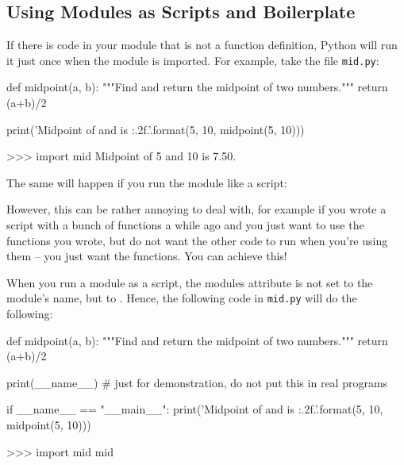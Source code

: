 \documentclass[11pt]{cselabheader}
\begin{document}
{\subsection{Using Modules as Scripts and Boilerplate}

If there is code in your module that is not a function definition, Python will
run it just once when the module is imported. For example, take the file
\texttt{mid.py}:

\begin{python3code}
def midpoint(a, b):
    """Find and return the midpoint of two numbers."""
    return (a+b)/2

print('Midpoint of {} and {} is {:.2f}.'.format(5, 10, midpoint(5, 10)))
\end{python3code}

\begin{pyconcode}
>>> import mid
Midpoint of 5 and 10 is 7.50.
\end{pyconcode}

The same will happen if you run the module like a script:


However, this can be rather annoying to deal with, for example if you wrote a
script with a bunch of functions a while ago and you just want to use the
functions you wrote, but do not want the other code to run when you're using
them -- you just want the functions. You can achieve this!

When you run a module as a script, the modules  attribute
is not set to the module's name, but to . Hence, the
following code in \texttt{mid.py} will do the following:

\begin{python3code}
def midpoint(a, b):
    """Find and return the midpoint of two numbers."""
    return (a+b)/2

print(__name__) # just for demonstration, do not put this in real programs

if __name__ == "__main__":
    print('Midpoint of {} and {} is {:.2f}.'.format(5, 10, midpoint(5, 10)))
\end{python3code}

\begin{pyconcode}
>>> import mid
mid
\end{pyconcode}

}
\end{document}
